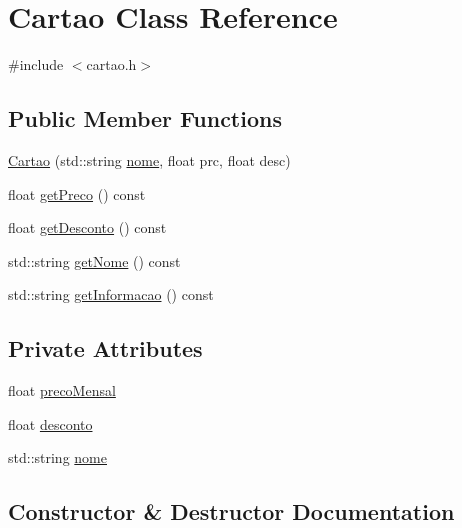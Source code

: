 \hypertarget{class_cartao}{}\section{Cartao Class Reference}
\label{class_cartao}


{\ttfamily \#include $<$cartao.\+h$>$}

\subsection*{Public Member Functions}
\begin{DoxyCompactItemize}
\item 
\mbox{\hyperlink{class_cartao_ae968e48767011c4daddbb85952c4c5db}{Cartao}} (std\+::string \mbox{\hyperlink{class_cartao_a831b64c396e3903ff85c8165640eb41a}{nome}}, float prc, float desc)
\item 
float \mbox{\hyperlink{class_cartao_a3b2aebc6843c561c862f2efe7ff02115}{get\+Preco}} () const
\item 
float \mbox{\hyperlink{class_cartao_a853d214e1f98f1f49c364b75942ab1c4}{get\+Desconto}} () const
\item 
std\+::string \mbox{\hyperlink{class_cartao_a60d369c3f5a4fe21aff1661ee7d90345}{get\+Nome}} () const
\item 
std\+::string \mbox{\hyperlink{class_cartao_a53a61ff5e28d5c7020fd84268dcddfb6}{get\+Informacao}} () const
\end{DoxyCompactItemize}
\subsection*{Private Attributes}
\begin{DoxyCompactItemize}
\item 
float \mbox{\hyperlink{class_cartao_adfaee23e98127abf18d04e93aa453f57}{preco\+Mensal}}
\item 
float \mbox{\hyperlink{class_cartao_a9abef37fa118bed1459d3c273c79a76a}{desconto}}
\item 
std\+::string \mbox{\hyperlink{class_cartao_a831b64c396e3903ff85c8165640eb41a}{nome}}
\end{DoxyCompactItemize}


\subsection{Constructor \& Destructor Documentation}
\mbox{\label{class_cartao_ae968e48767011c4daddbb85952c4c5db}} 
